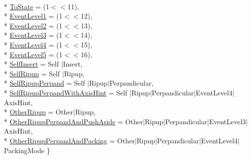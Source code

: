 \begin{DoxyCompactItemize}
\\*
\hyperlink{classKite_1_1SegmentAction_a1d1cfd8ffb84e947f82999c682b666a7a8b27ea2f99b2e6446eac77626aef0711}{To\-State} = (1$<$$<$11), 
\\*
\hyperlink{classKite_1_1SegmentAction_a1d1cfd8ffb84e947f82999c682b666a7adb9a006587bc8a635ffdd034c53a546f}{Event\-Level1} = (1$<$$<$12), 
\\*
\hyperlink{classKite_1_1SegmentAction_a1d1cfd8ffb84e947f82999c682b666a7a5bad02627a87d3e38d5812363e46d7b1}{Event\-Level2} = (1$<$$<$13), 
\\*
\hyperlink{classKite_1_1SegmentAction_a1d1cfd8ffb84e947f82999c682b666a7a11ef388ea422168a9c79fd9b4d81ea34}{Event\-Level3} = (1$<$$<$14), 
\\*
\hyperlink{classKite_1_1SegmentAction_a1d1cfd8ffb84e947f82999c682b666a7ab8346062d5bbccb98893c4675b8d5098}{Event\-Level4} = (1$<$$<$15), 
\\*
\hyperlink{classKite_1_1SegmentAction_a1d1cfd8ffb84e947f82999c682b666a7a432d5152211bf70a2d561b8bda34c9e0}{Event\-Level5} = (1$<$$<$16), 
\\*
\hyperlink{classKite_1_1SegmentAction_a1d1cfd8ffb84e947f82999c682b666a7a930d0718b2afc37983ffe708f8261b19}{Self\-Insert} = Self $|$\-Insert, 
\\*
\hyperlink{classKite_1_1SegmentAction_a1d1cfd8ffb84e947f82999c682b666a7a837e07a8b4101cff32018683072f2d78}{Self\-Ripup} = Self $|$\-Ripup, 
\\*
\hyperlink{classKite_1_1SegmentAction_a1d1cfd8ffb84e947f82999c682b666a7a85fd77114c99a0827e08de2fc6a53ed7}{Self\-Ripup\-Perpand} = Self $|$\-Ripup$|$\-Perpandicular, 
\\*
\hyperlink{classKite_1_1SegmentAction_a1d1cfd8ffb84e947f82999c682b666a7ae30745ee276038ba4d7b5f92d80f3715}{Self\-Ripup\-Perpand\-With\-Axis\-Hint} = Self $|$\-Ripup$|$\-Perpandicular$|$\-Event\-Level4$|$\-Axis\-Hint, 
\\*
\hyperlink{classKite_1_1SegmentAction_a1d1cfd8ffb84e947f82999c682b666a7a22374bab829fac7d12af4784d80eeb6e}{Other\-Ripup} = Other$|$\-Ripup, 
\\*
\hyperlink{classKite_1_1SegmentAction_a1d1cfd8ffb84e947f82999c682b666a7ad9caf9375b714a403e4af8a142cf9991}{Other\-Ripup\-Perpand\-And\-Push\-Aside} = Other$|$\-Ripup$|$\-Perpandicular$|$\-Event\-Level3$|$\-Axis\-Hint, 
\\*
\hyperlink{classKite_1_1SegmentAction_a1d1cfd8ffb84e947f82999c682b666a7aed50f579a9e6b7ac698b2edf1a5da5c8}{Other\-Ripup\-Perpand\-And\-Packing} = Other$|$\-Ripup$|$\-Perpandicular$|$\-Event\-Level4$|$\-Packing\-Mode
 \}
\end{DoxyCompactItemize}
